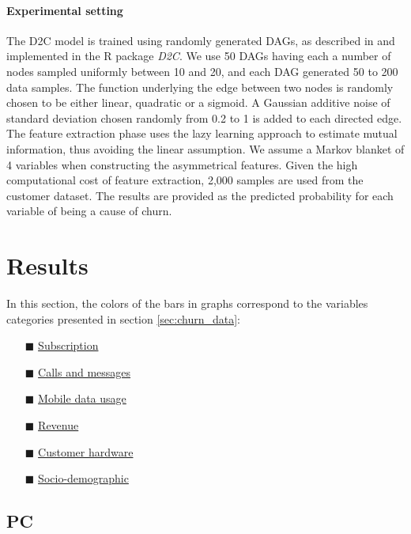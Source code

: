 \paragraph{Experimental setting}  The D2C model is trained using randomly
generated DAGs, as described in \parencite{bontempi2015dependency} and
implemented in the R package \emph{D2C}. We use 50 DAGs having each a number of
nodes sampled uniformly between 10 and 20, and each DAG generated 50 to 200
data samples. The function underlying the edge between two nodes is randomly
chosen to be either linear, quadratic or a sigmoid. A Gaussian additive noise of
standard deviation chosen randomly from 0.2 to 1 is added to each directed
edge. The feature extraction phase uses the lazy learning approach
\parencite{bontempi1999lazy} to estimate mutual information, thus avoiding the
linear assumption. We assume a Markov blanket of 4 variables when constructing
the asymmetrical features. Given the high computational cost of feature
extraction, 2,000 samples are used from the customer dataset. The results are
provided as the predicted probability for each variable of being a cause of
churn.

\section{Results}

In this section, the colors of the bars in graphs correspond to the
variables categories presented in section \ref{sec:churn_data}:

\begin{itemize}
    \item[\color{themeyellow}$\blacksquare$] \ul{Subscription}
    \item[\color{themeblue}$\blacksquare$] \ul{Calls and messages}
    \item[\color{darkerblue}$\blacksquare$] \ul{Mobile data usage}
    \item[\color{themepurple}$\blacksquare$] \ul{Revenue}
    \item[\color{darkerorange}$\blacksquare$] \ul{Customer hardware}
    \item[\color{themeorange}$\blacksquare$] \ul{Socio-demographic}
\end{itemize}

\subsection{PC}

